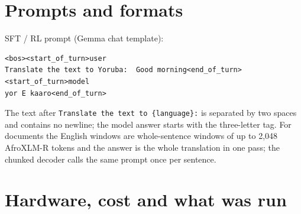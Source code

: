 \section{Prompts and formats}\label{prompts-and-formats}

SFT / RL prompt (Gemma chat template):

\begin{verbatim}
<bos><start_of_turn>user
Translate the text to Yoruba:  Good morning<end_of_turn>
<start_of_turn>model
yor E kaaro<end_of_turn>
\end{verbatim}

The text after \texttt{Translate\ the\ text\ to\ \{language\}:} is separated by two spaces and contains no newline; the model answer starts with the three-letter tag. For documents the English windows are whole-sentence windows of up to 2,048 AfroXLM-R tokens and the answer is the whole translation in one pass; the chunked decoder calls the same prompt once per sentence.

\section{Hardware, cost and what was run}\label{hardware-cost-and-what-was-run}

